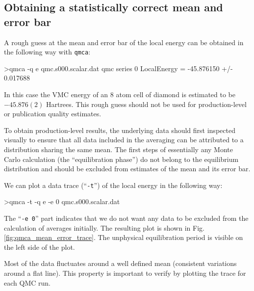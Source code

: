 \subsection{Obtaining a statistically correct mean and error bar}
\label{sec:qmca_mean_error}
A rough guess at the mean and error bar of the local energy can be 
obtained in the following way with \texttt{qmca}:
\begin{shade}
>qmca -q e qmc.s000.scalar.dat 
qmc  series 0  LocalEnergy           =  -45.876150 +/- 0.017688 
\end{shade}
\noindent
In this case the VMC energy of an 8 atom cell of diamond is estimated 
to be $-45.876(2)$ Hartrees.  This rough guess should not be used 
for production-level or publication quality estimates.

To obtain production-level results, the underlying data should first  
inspected visually to ensure that all data included in the averaging 
can be attributed to a distribution sharing the same mean.  The first 
steps of essentially any Monte Carlo calculation (the ``equilibration 
phase'') do not belong to the equilibrium distribution and should be 
excluded from estimates of the mean and its error bar.

We can plot a data trace (``\texttt{-t}'') of the local energy in the 
following way:
\begin{shade}
>qmca -t -q e -e 0 qmc.s000.scalar.dat
\end{shade}
\noindent
The ``\texttt{-e 0}'' part indicates that we do not want any data 
to be excluded from the calculation of averages initially.  The resulting 
plot is shown in Fig. \ref{fig:qmca_mean_error_trace}.  The unphysical 
equilibration period is visible on the left side of the plot.

Most of the data fluctuates around a well defined mean (consistent 
variations around a flat line).  This property is important to verify  
by plotting the trace for each QMC run. 

